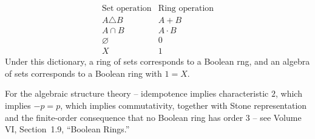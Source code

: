 \begin{remark*}[Dictionary]
\[
\begin{array}{c|c}
\text{Set operation} & \text{Ring operation}\\ \hline
A\triangle B & A+B\\
A\cap B & A\cdot B\\
\varnothing & 0\\
X & 1
\end{array}
\]
Under this dictionary, a ring of sets corresponds to a Boolean rng, and an
algebra of sets corresponds to a Boolean ring with $1=X$.
\end{remark*}

\begin{remark*}
For the algebraic structure theory -- idempotence implies characteristic $2$,
which implies $-p=p$, which implies commutativity, together with Stone
representation and the finite-order consequence that no Boolean ring has
order $3$ -- see Volume VI, Section~1.9, ``Boolean Rings.''
\end{remark*}
